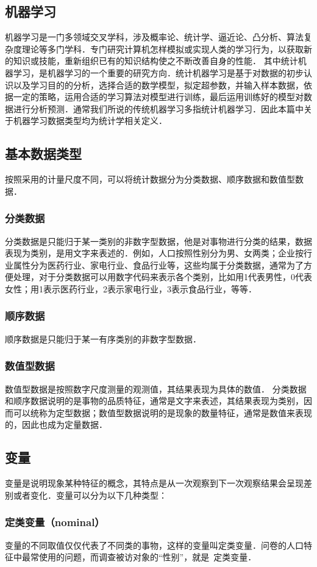 \subsection{机器学习}
机器学习是一门多领域交叉学科，涉及概率论、统计学、逼近论、凸分析、算法复杂度理论等多门学科．专门研究计算机怎样模拟或实现人类的学习行为，以获取新的知识或技能，重新组织已有的知识结构使之不断改善自身的性能．
其中统计机器学习，是机器学习的一个重要的研究方向．统计机器学习是基于对数据的初步认识以及学习目的的分析，选择合适的数学模型，拟定超参数，并输入样本数据，依据一定的策略，运用合适的学习算法对模型进行训练，最后运用训练好的模型对数据进行分析预测．通常我们所说的传统机器学习多指统计机器学习．因此本篇中关于机器学习数据类型均为统计学相关定义．

\subsection{基本数据类型}
按照采用的计量尺度不同，可以将统计数据分为分类数据、顺序数据和数值型数据．
\subsubsection{分类数据}
分类数据是只能归于某一类别的非数字型数据，他是对事物进行分类的结果，数据表现为类别，是用文字来表述的．例如，人口按照性别分为男、女两类；企业按行业属性分为医药行业、家电行业、食品行业等，这些均属于分类数据，通常为了方便处理，对于分类数据可以用数字代码来表示各个类别，比如用1代表男性，0代表女性；用1表示医药行业，2表示家电行业，3表示食品行业，等等．
\subsubsection{顺序数据}
顺序数据是只能归于某一有序类别的非数字型数据．
\subsubsection{数值型数据}
数值型数据是按照数字尺度测量的观测值，其结果表现为具体的数值．
分类数据和顺序数据说明的是事物的品质特征，通常是文字来表述，其结果表现为类别，因而可以统称为定型数据；数值型数据说明的是现象的数量特征，通常是数值来表现的，因此也成为定量数据．
\subsection{变量}
变量是说明现象某种特征的概念，其特点是从一次观察到下一次观察结果会呈现差别或者变化．变量可以分为以下几种类型：
\subsubsection{定类变量（nominal）}
变量的不同取值仅仅代表了不同类的事物，这样的变量叫定类变量．问卷的人口特征中最常使用的问题，而调查被访对象的“性别”，就是 定类变量．
